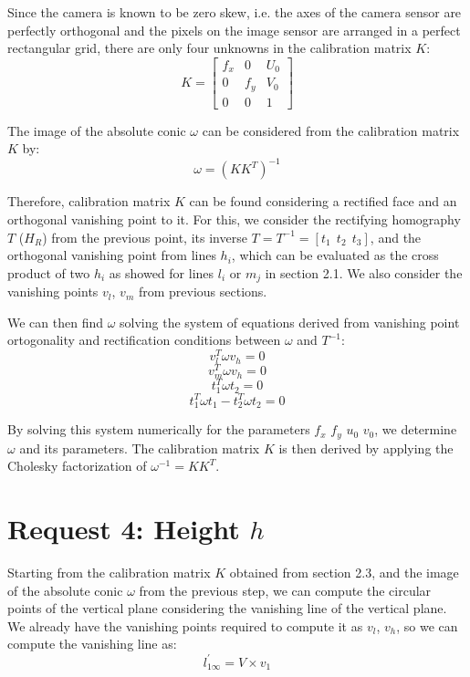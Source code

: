 \documentclass{Configuration_Files/PoliMi3i_thesis}
\begin{document}
\noindent
Since the camera is known to be zero skew, i.e. the axes of the camera sensor are perfectly orthogonal and the pixels on the image sensor are arranged in a perfect rectangular grid, there are only four unknowns in the calibration matrix \(K\):
\[
K = \begin{bmatrix} f_{x} & 0 & U_{0} \\ 0 & f_{y} & V_{0} \\ 0 & 0 & 1 \end{bmatrix}  
\]

\noindent
The image of the absolute conic \(\omega\) can be considered from the calibration matrix \(K\) by:
\[
\omega = (KK^{T})^{-1}  
\]

\noindent
Therefore, calibration matrix \(K\) can be found considering a rectified face and an orthogonal vanishing point to it. For this, we consider the rectifying homography \(T\) ($H_R$) from the previous point, its inverse \(T = T^{-1} = \left[ t_{1} ~~ t_{2} ~~ t_{3} \right]\), and the orthogonal vanishing point from lines \(h_{i}\), which can be evaluated as the cross product of two \(h_{i}\) as showed for lines \(l_{i}\) or \(m_{j}\) in section 2.1. We also consider the vanishing points \(v_{l}\), \(v_{m}\) from previous sections.

We can then find \(\omega\) solving the system of equations derived from vanishing point ortogonality and rectification conditions between \(\omega\) and \(T^{-1}\):
\[
v_{l}^{T} \omega v_{h} = 0
\]
\[
v_{m}^{T} \omega v_{h} = 0  
\]
\[
t_{1}^{T} \omega t_{2} = 0  
\]
\[
t_{1}^{T} \omega t_{1} - t_{2}^{T} \omega t_{2} = 0  
\]

\noindent
By solving this system numerically for the parameters \(f_{x}\) \(f_{y}\) \(u_{0}\) \(v_{0}\), we determine \(\omega\) and its parameters. The calibration matrix \(K\) is then derived by applying the Cholesky factorization of \(\omega^{-1} = KK^{T}\).



\newpage
\section{Request 4: Height \(h\)}

\noindent
Starting from the calibration matrix \(K\) obtained from section 2.3, and the image of the absolute conic \(\omega\) from the previous step, we can compute the circular points of the vertical plane considering the vanishing line of the vertical plane.
We already have the vanishing points required to compute it as \(v_{l}\), \(v_{h}\), so we can compute the vanishing line as:
\[
l^{\prime}_{1\infty} = V \times v_{1}  
\]
\end{document}
